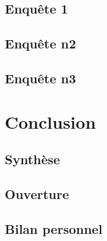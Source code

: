 \subsection{Enquête 1}
\subsection{Enquête n2}
\subsection{Enquête n3}
\section{Conclusion}
\subsection{Synthèse}
\subsection{Ouverture}
\subsection{Bilan personnel}




\printbibliography

